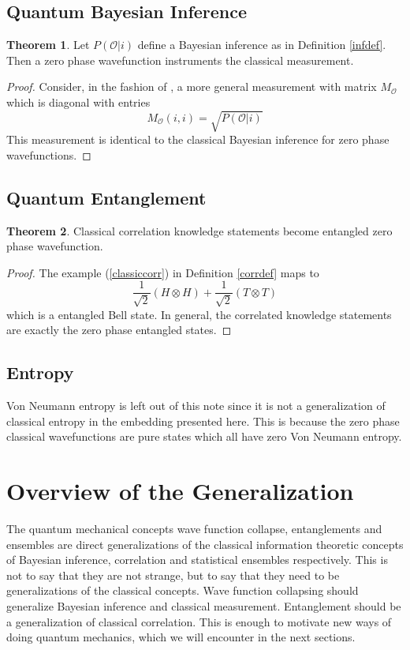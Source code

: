 \documentclass[12pt,a4paper]{article}
\theoremstyle{myrule}
\theoremstyle{postulate}
\theoremstyle{definition}
\newtheorem{theorem}{Theorem}[section]
\begin{document}
\subsection{Quantum Bayesian Inference}
\begin{theorem}
  Let $P(\mathcal{O} | i)$ define a Bayesian inference as in Definition \ref{infdef}.  Then a zero phase wavefunction instruments the classical measurement.
\end{theorem}
\begin{proof}
Consider, in the fashion of \cite{nielsenchuang}, a more general measurement with matrix $M_\mathcal{O}$ which is diagonal with entries
\[
   M_\mathcal{O}(i,i) = \sqrt{P(\mathcal{O} | i)}
\]
This measurement is identical to the classical Bayesian inference for zero phase wavefunctions.
\end{proof}

\subsection{Quantum Entanglement}
\begin{theorem}
  Classical correlation knowledge statements become entangled zero phase wavefunction.
\end{theorem}
\begin{proof}
  The example (\ref{classiccorr}) in Definition \ref{corrdef} maps to
  \[
  \frac{1}{\sqrt{2}} (H \otimes H) + \frac{1}{\sqrt{2}} (T \otimes T)
  \]
which is a entangled Bell state.  In general, the correlated knowledge statements are exactly the zero phase entangled states.
\end{proof}
\subsection{Entropy}
Von Neumann entropy is left out of this note since it is not a generalization of classical entropy in the embedding presented here.  This is because the zero phase classical wavefunctions are pure states which all have zero Von Neumann entropy.

\section{Overview of the Generalization}

The quantum mechanical concepts wave function collapse, entanglements and ensembles are direct generalizations of the classical information theoretic concepts of Bayesian inference, correlation and statistical ensembles respectively.  This is not to say that they are not strange, but to say that they need to be generalizations of the classical concepts.  Wave function collapsing should generalize Bayesian inference and classical measurement.  Entanglement should be a generalization of classical correlation.  This is enough to motivate new ways of doing quantum mechanics, which we will encounter in the next sections.
\end{document}
